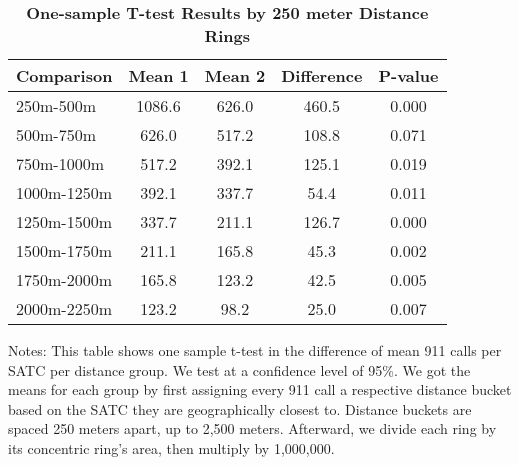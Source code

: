 \begin{table}[htbp]
\centering
\begin{tabular}{l|c c c c}
\hline
Comparison & Mean 1 & Mean 2 & Difference & P-value \\
\hline
250m-500m & 1086.6 & 626.0 & 460.5 & 0.000 \\
500m-750m & 626.0 & 517.2 & 108.8 & 0.071 \\
750m-1000m & 517.2 & 392.1 & 125.1 & 0.019 \\
1000m-1250m & 392.1 & 337.7 & 54.4 & 0.011 \\
1250m-1500m & 337.7 & 211.1 & 126.7 & 0.000 \\
1500m-1750m & 211.1 & 165.8 & 45.3 & 0.002 \\
1750m-2000m & 165.8 & 123.2 & 42.5 & 0.005 \\
2000m-2250m & 123.2 & 98.2 & 25.0 & 0.007 \\
\hline
\end{tabular}
\caption{\textbf{One-sample T-test Results by 250 meter Distance Rings}}
\label{tab:ttests_250}  
\centering\footnotesize{Notes: This table shows one sample t-test in the difference of mean 911 calls per SATC per distance group. We test at a confidence level of 95\%. We got the means for each group by first assigning every 911 call a respective distance bucket based on the SATC they are geographically closest to. Distance buckets are spaced 250 meters apart, up to 2,500 meters. Afterward, we divide each ring by its concentric ring's area, then multiply by 1,000,000.}
\end{table}
